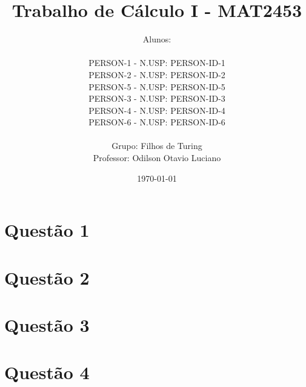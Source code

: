 \documentclass[12pt, a4paper]{article}
\title{
	Trabalho de Cálculo I - MAT2453
}
\author{
	Alunos:
	\\  
	\\ {{PERSON-1}} - N.USP: {{PERSON-ID-1}}
	\\ {{PERSON-2}} - N.USP: {{PERSON-ID-2}}
	\\ {{PERSON-5}} - N.USP: {{PERSON-ID-5}}
	\\ {{PERSON-3}} - N.USP: {{PERSON-ID-3}}
	\\ {{PERSON-4}} - N.USP: {{PERSON-ID-4}}
	\\ {{PERSON-6}} - N.USP: {{PERSON-ID-6}}
	\\ \\
	Grupo: Filhos de Turing
	\\ Professor: Odilson Otavio Luciano
}
\date{\today}
\begin{document}
	\maketitle
	\thispagestyle{empty}
	\newpage

	\clearpage
	\thispagestyle{empty}
	\hfill
	\clearpage

	\tableofcontents
	
	\newpage

	\section{Questão 1}

	
	\newpage

	\section{Questão 2}

	
	\newpage

	\section{Questão 3}

	
	\newpage

	\section{Questão 4}

	
	\newpage
\end{document}
